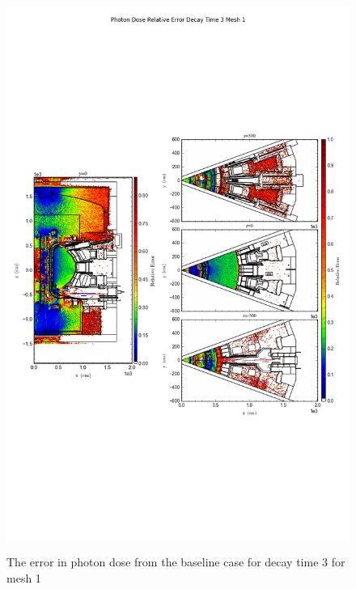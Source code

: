 \begin{figure}[ht!]
\centering
\includegraphics[trim={0cm 9cm 0cm 10cm},clip,scale=0.75]{../plots/final_model/Photon_Dose_Relative_Error_Decay_Time_3_Mesh_1.png}
\label{fig:photons_dc3_no4bc_m1_error}
\caption{The error in photon dose from the baseline case for decay time 3 for mesh 1}
\end{figure}
